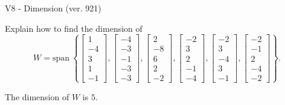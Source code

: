 \begin{exercise}
  \begin{exerciseTitle}V8 - Dimension (ver. 921)\end{exerciseTitle}
  \begin{exerciseStatement}
    Explain how to find the dimension of 
\[W=\mathrm{span}\ \left\{\left[\begin{array}{r}
1 \\
-4 \\
3 \\
1 \\
-1
\end{array}\right] , \left[\begin{array}{r}
-4 \\
-3 \\
-1 \\
-3 \\
-3
\end{array}\right] , \left[\begin{array}{r}
2 \\
-8 \\
6 \\
2 \\
-2
\end{array}\right] , \left[\begin{array}{r}
-2 \\
3 \\
2 \\
-1 \\
-4
\end{array}\right] , \left[\begin{array}{r}
-2 \\
3 \\
-4 \\
3 \\
-1
\end{array}\right] , \left[\begin{array}{r}
-2 \\
-1 \\
2 \\
-4 \\
-2
\end{array}\right]\right\}.\]



  \end{exerciseStatement}
  \begin{exerciseAnswer}
   The dimension of \(W\) is  \(5\).
  


  \end{exerciseAnswer}
\end{exercise}